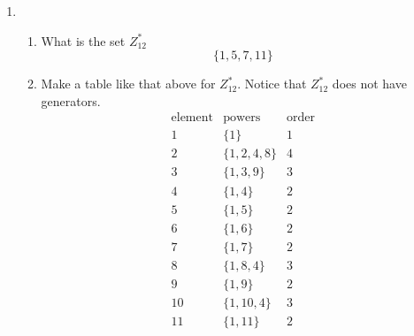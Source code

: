 \documentclass[12pt]{amsart}
\theoremstyle{definition}
\begin{document}
\begin{enumerate}
\item
\begin{enumerate}
\item What is the set $Z_{12}^*$
\\
$$\{1,5,7,11\}$$
\item Make a table like that above for $Z_{12}^*$. Notice that $Z_{12}^*$ does not have generators.
\begin{equation*}
\begin{array}{c|c|c}
\text{element} & \text{powers} & \text{order}

\\
\hline
1 & \{1\} & 1
\\
\hline
2 & \{1, 2, 4, 8\} & 4
\\
\hline
3 & \{1, 3, 9\} & 3
\\
\hline
4 & \{1, 4\} & 2
\\
\hline
5 & \{1, 5\} & 2
\\
\hline
6 & \{1, 6\} & 2
\\
\hline
7 & \{1, 7\} & 2
\\
\hline
8 & \{1, 8, 4\} & 3
\\
\hline
9 & \{1, 9\} & 2
\\
\hline
10 & \{1, 10, 4\} & 3
\\
\hline
11 & \{1, 11\} & 2


\end{array}
\end{equation*}

\end{enumerate}


\end{enumerate}
\end{document}
